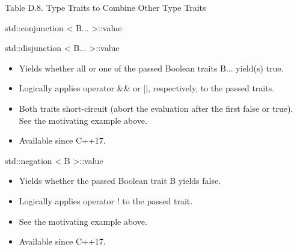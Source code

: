 \begin{center}
Table D.8. Type Traits to Combine Other Type Traits
\end{center}

std::conjunction < B... >::value

std::disjunction < B... >::value

\begin{itemize}
\item 
Yields whether all or one of the passed Boolean traits B... yield(s) true.

\item 
Logically applies operator \&\& or ||, respectively, to the passed traits.

\item 
Both traits short-circuit (abort the evaluation after the first false or true). See the motivating example above.

\item 
Available since C++17.
\end{itemize}

std::negation < B >::value

\begin{itemize}
\item 
Yields whether the passed Boolean trait B yields false.

\item 
Logically applies operator ! to the passed trait.

\item 
See the motivating example above.

\item 
Available since C++17.
\end{itemize}













